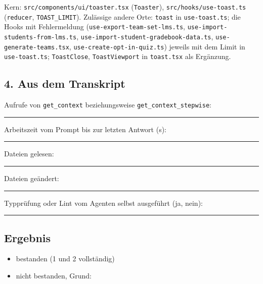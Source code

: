 Kern: \texttt{src/\allowbreak{}components/\allowbreak{}ui/\allowbreak{}toaster.tsx} (\texttt{Toaster}), \texttt{src/\allowbreak{}hooks/\allowbreak{}use-\allowbreak{}toast.ts} (\texttt{reducer}, \texttt{TOAST\_LIMIT}). Zulässige andere Orte: \texttt{toast} in \texttt{use-\allowbreak{}toast.ts}; die Hooks mit Fehlermeldung (\texttt{use-\allowbreak{}export-\allowbreak{}team-\allowbreak{}set-\allowbreak{}lms.ts}, \texttt{use-\allowbreak{}import-\allowbreak{}students-\allowbreak{}from-\allowbreak{}lms.ts}, \texttt{use-\allowbreak{}import-\allowbreak{}student-\allowbreak{}gradebook-\allowbreak{}data.ts}, \texttt{use-\allowbreak{}generate-\allowbreak{}teams.tsx}, \texttt{use-\allowbreak{}create-\allowbreak{}opt-\allowbreak{}in-\allowbreak{}quiz.ts}) jeweils mit dem Limit in \texttt{use-\allowbreak{}toast.ts}; \texttt{ToastClose}, \texttt{ToastViewport} in \texttt{toast.tsx} als Ergänzung.

\subsection*{4. Aus dem Transkript}

\noindent Aufrufe von \texttt{get\_context} beziehungsweise \texttt{get\_context\_stepwise}:~\rule{2.5em}{0.4pt}\par
\noindent Arbeitszeit vom Prompt bis zur letzten Antwort (s):~\rule{2.5em}{0.4pt}\par
\noindent Dateien gelesen:~\rule{2.5em}{0.4pt}\par
\noindent Dateien geändert:~\rule{2.5em}{0.4pt}\par
\noindent Typprüfung oder Lint vom Agenten selbst ausgeführt (ja, nein):~\rule{2.5em}{0.4pt}\par
\subsection*{Ergebnis}

\begin{itemize}[nosep,leftmargin=2.4em]
\item[\kreuz] bestanden (1 und 2 vollständig)
\item[\kreuz] nicht bestanden, Grund:
\end{itemize}
